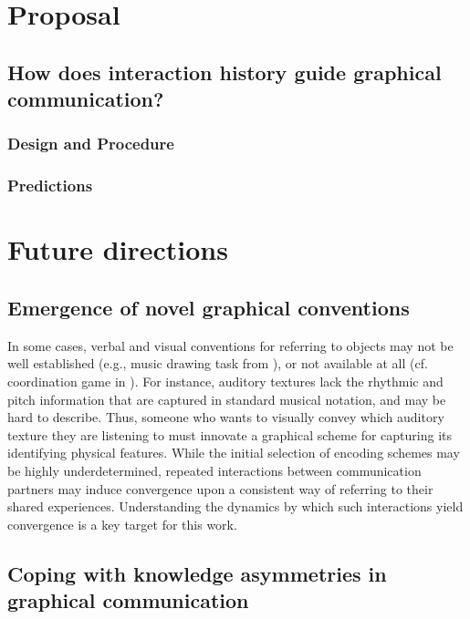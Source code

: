 \documentclass[12pt]{article}
\begin{document}
\section{Proposal}



\subsection{How does interaction history guide graphical communication?}



\subsubsection{Design and Procedure}

\subsubsection{Predictions}

\section{Future directions}

\subsection{Emergence of novel graphical conventions}

In some cases, verbal and visual conventions for referring to objects may not be well established (e.g., music drawing task from ), or not available at all (cf. coordination game in ). For instance, auditory textures \cite{McDermott:2013ky} lack the rhythmic and pitch information that are captured in standard musical notation, and may be hard to describe. Thus, someone who wants to visually convey which auditory texture they are listening to must innovate a graphical scheme for capturing its identifying physical features. While the initial selection of encoding schemes may be highly underdetermined, repeated interactions between communication partners may induce convergence upon a consistent way of referring to their shared experiences. Understanding the dynamics by which such interactions yield convergence is a key target for this work. 

\subsection{Coping with knowledge asymmetries in graphical communication}
\end{document}

